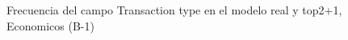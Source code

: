 \begin{figure}[H]
    \centering
    
    \caption{Frecuencia del campo Transaction type en el modelo real y top2+1, Economicos (B-1)}
    \label{frecuency-Transaction Type-top2+1}
\end{figure}
